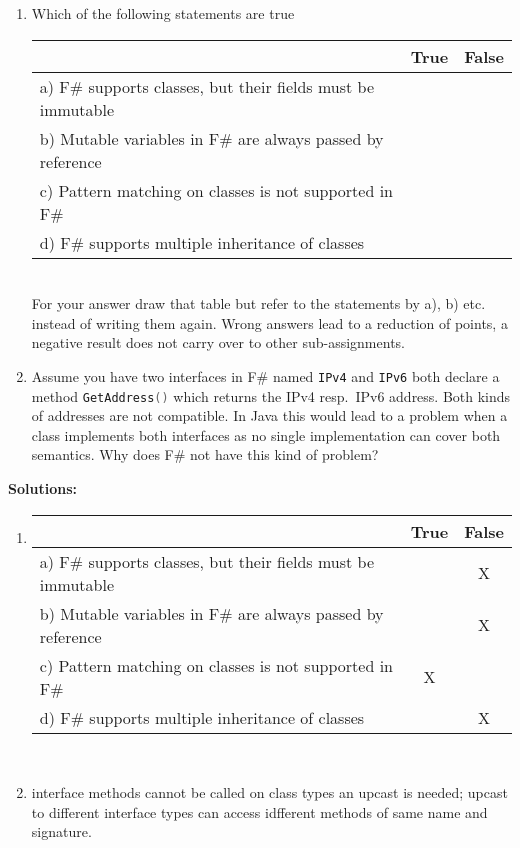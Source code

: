 \documentclass{article}
\newcommand{\solution}[1] {\textbf{Solutions:}\\ #1}
\newcommand{\comment}[1]{\marginpar{#1}}
\begin{document}
\begin{enumerate}
  \item \comment{\textbf{[2 points]}}Which of the following statements are true\\
    \begin{tabular}{|p{6cm}|c|c|}\hline
      & True & False \\ \hline
     a) F\# supports classes, but their fields must be immutable & & \\\hline
     b) Mutable variables in F\# are always passed by reference & & \\\hline
     c) Pattern matching on classes is not supported in F\#& & \\\hline
     d) F\# supports multiple inheritance of classes & & \\\hline
   \end{tabular}\\
   For your answer draw that table but refer to the statements by a),
   b) etc. instead of writing them again. Wrong answers lead to a
   reduction of points, a negative result does not carry over to other
   sub-assignments. 
 \item \comment{\textbf{[1 point]}} Assume you have two interfaces in F\# named
   \lstinline[language=FSharp]{IPv4} and
   \lstinline[language=FSharp]{IPv6} both declare a method
   \lstinline[language=FSharp]{GetAddress()} which returns the IPv4
   resp.\ IPv6 address. Both kinds of addresses are not compatible. In
   Java this would lead to a problem when a class implements both
   interfaces as no single implementation can cover both
   semantics. Why does F\# not have this kind of problem?
\end{enumerate}

\solution{
\begin{enumerate}
\item 
    \begin{tabular}{|p{6cm}|c|c|}\hline
      & True & False \\ \hline
     a) F\# supports classes, but their fields must be immutable & & X \\\hline
     b) Mutable variables in F\# are always passed by reference & & X \\\hline
     c) Pattern matching on classes is not supported in F\#& X & \\\hline
     d) F\# supports multiple inheritance of classes & & X\\\hline
   \end{tabular}\\
\item interface methods cannot be called on class types an upcast is
  needed; upcast to different interface types can access idfferent
  methods of same name and signature.
\end{enumerate}

}
\end{document}

